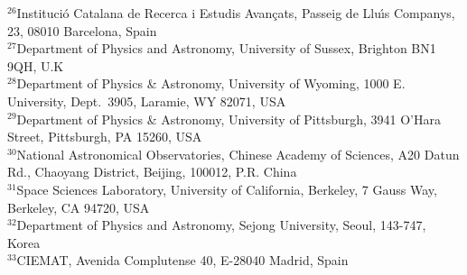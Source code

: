 {$^{26}$Instituci\'{o} Catalana de Recerca i Estudis Avan\c{c}ats, Passeig de Llu\'{\i}s Companys, 23, 08010 Barcelona, Spain\\ 
$^{27}$Department of Physics and Astronomy, University of Sussex, Brighton BN1 9QH, U.K\\ 
$^{28}$Department of Physics \& Astronomy, University  of Wyoming, 1000 E. University, Dept.~3905, Laramie, WY 82071, USA\\ 
$^{29}$Department of Physics \& Astronomy, University of Pittsburgh, 3941 O'Hara Street, Pittsburgh, PA 15260, USA\\ 
$^{30}$National Astronomical Observatories, Chinese Academy of Sciences, A20 Datun Rd., Chaoyang District, Beijing, 100012, P.R. China\\ 
$^{31}$Space Sciences Laboratory, University of California, Berkeley, 7 Gauss Way, Berkeley, CA  94720, USA\\ 
$^{32}$Department of Physics and Astronomy, Sejong University, Seoul, 143-747, Korea\\ 
$^{33}$CIEMAT, Avenida Complutense 40, E-28040 Madrid, Spain}